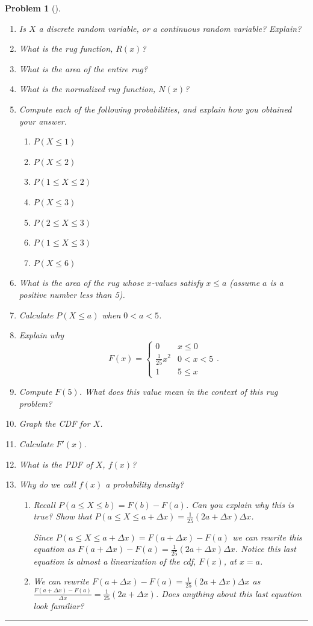 \documentclass[letterpaper,oneside]{book}%
\theoremstyle{plain}
\theoremstyle{box}
\theoremstyle{problem}
\newtheorem{problemnum}{Problem}[chapter]
\newenvironment{problem}[1][]{\begin{problemnum}[#1]}{\end{problemnum}\nopagebreak\hrule\bigskip}
\begin{document}
\begin{problem}
\begin{enumerate}
  \item Is $X$ a discrete random variable, or a continuous random variable? Explain?
  \item What is the rug function, $R(x)$?
  \item What is the area of the entire rug?
  \item What is the normalized rug function, $N(x)$?
  \item Compute each of the following probabilities, and explain how you obtained your answer.
   \begin{enumerate}
    \item $P(X\leq 1)$
    \item $P(X\leq 2)$
    \item $P(1\leq X\leq 2)$
    \item $P(X\leq 3)$
    \item $P(2\leq X\leq 3)$
    \item $P(1\leq X\leq 3)$
    \item $P(X \leq 6)$
   \end{enumerate}
  \item What is the area of the rug whose $x$-values satisfy $x\leq a$ (assume $a$ is a positive number less than 5).  
  \item Calculate $P(X \leq a)$ when $0 < a < 5$. 
  \item Explain why $$F(x) =\begin{cases}0 & x \leq 0\\ \frac{1}{25}x^2 & 0 < x < 5 \\ 1 &5 \leq x\end{cases}.$$
  \item Compute $F(5)$.  What does this value mean in the context of this rug problem?
  \item Graph the CDF for $X$.
  \item Calculate $F'(x)$.
  \item What is the PDF of $X$, $f(x)$?
  \item Why do we call $f(x)$ a probability density?
  \begin{enumerate}
  \item Recall $P(a\leq X\leq b) = F(b)-F(a)$. Can you explain why this is true? Show that $P(a \leq X \leq a +\Delta x) = \frac{1}{25} (2a + \Delta x) \Delta x$. 
  
Since $P(a \leq X \leq a +\Delta x) = F(a + \Delta x) - F(a)$ we can rewrite this equation as $F(a + \Delta x) - F(a) = \frac{1}{25} (2a + \Delta x) \Delta x$. Notice this last equation is almost a linearization of the cdf, $F(x)$, at $x = a$.
  \item We can rewrite $F(a + \Delta x) - F(a) = \frac{1}{25} (2a + \Delta x) \Delta x$ as $\frac{F(a + \Delta x) - F(a)}{\Delta x} = \frac{1}{25} (2a + \Delta x)$. Does anything about this last equation look familiar?
  

\end{enumerate}
\end{enumerate}
\end{problem}
\end{document}
